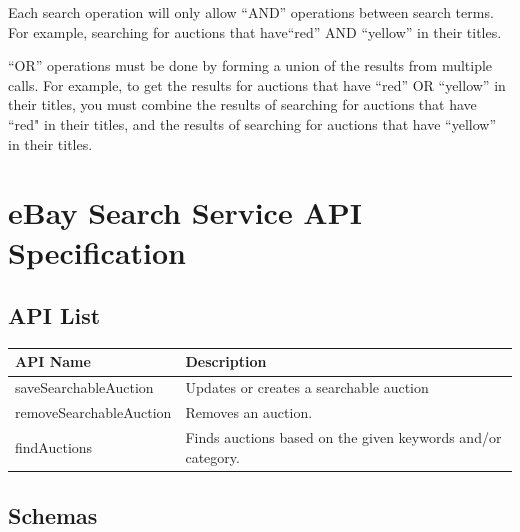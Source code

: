 \documentclass[12pt,a4paper]{article}
\begin{document}
Each search operation will only allow ``AND'' operations between search terms. 
For example, searching for auctions that have``red'' AND ``yellow'' in their titles.
\vspace{\baselineskip}

``OR'' operations must be done by forming a union of the results from multiple calls. 
For example, to get the results for auctions that have ``red'' OR ``yellow'' in their titles, 
you must combine the results of searching for auctions that have ``red" in their titles,
and the results of searching for auctions that have ``yellow'' in their titles.


\pagebreak

 
\section{eBay Search Service API Specification}

\subsection{API List}
\begin{center}
    \begin{tabular}{| l | l |}
        \hline
        \textbf{API Name} & \textbf{Description} \\
        \hline
            saveSearchableAuction & Updates or creates a searchable auction \\ 
        \hline
            removeSearchableAuction & Removes an auction. \\
        \hline
            findAuctions & Finds auctions based on the given keywords and/or category. \\
        \hline
    \end{tabular}
\end{center}

\subsection{Schemas}
\end{document}
